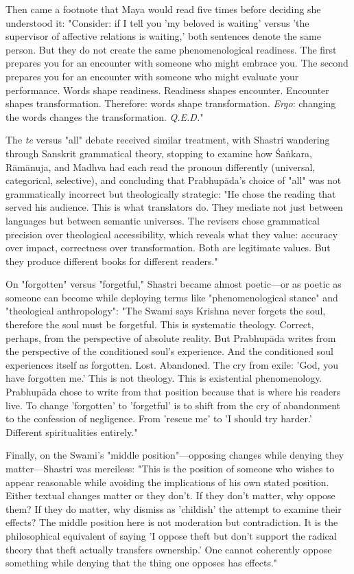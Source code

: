 \documentclass[12pt,twoside]{book}
\begin{document}
Then came a footnote that Maya would read five times before deciding she understood it: "Consider: if I tell you 'my beloved is waiting' versus 'the supervisor of affective relations is waiting,' both sentences denote the same person. But they do not create the same phenomenological readiness. The first prepares you for an encounter with someone who might embrace you. The second prepares you for an encounter with someone who might evaluate your performance. Words shape readiness. Readiness shapes encounter. Encounter shapes transformation. Therefore: words shape transformation. \emph{Ergo}: changing the words changes the transformation. \emph{Q.E.D.}"

The \emph{te} versus "all" debate received similar treatment, with Shastri wandering through Sanskrit grammatical theory, stopping to examine how Śaṅkara, Rāmānuja, and Madhva had each read the pronoun differently (universal, categorical, selective), and concluding that Prabhupāda's choice of "all" was not grammatically incorrect but theologically strategic: "He chose the reading that served his audience. This is what translators do. They mediate not just between languages but between semantic universes. The revisers chose grammatical precision over theological accessibility, which reveals what they value: accuracy over impact, correctness over transformation. Both are legitimate values. But they produce different books for different readers."

On "forgotten" versus "forgetful," Shastri became almost poetic—or as poetic as someone can become while deploying terms like "phenomenological stance" and "theological anthropology": "The Swami says Krishna never forgets the soul, therefore the soul must be forgetful. This is systematic theology. Correct, perhaps, from the perspective of absolute reality. But Prabhupāda writes from the perspective of the conditioned soul's experience. And the conditioned soul experiences itself as forgotten. Lost. Abandoned. The cry from exile: 'God, you have forgotten me.' This is not theology. This is existential phenomenology. Prabhupāda chose to write from that position because that is where his readers live. To change 'forgotten' to 'forgetful' is to shift from the cry of abandonment to the confession of negligence. From 'rescue me' to 'I should try harder.' Different spiritualities entirely."

Finally, on the Swami's "middle position"—opposing changes while denying they matter—Shastri was merciless: "This is the position of someone who wishes to appear reasonable while avoiding the implications of his own stated position. Either textual changes matter or they don't. If they don't matter, why oppose them? If they do matter, why dismiss as 'childish' the attempt to examine their effects? The middle position here is not moderation but contradiction. It is the philosophical equivalent of saying 'I oppose theft but don't support the radical theory that theft actually transfers ownership.' One cannot coherently oppose something while denying that the thing one opposes has effects."
\end{document}
